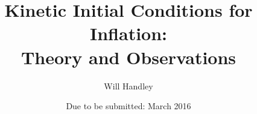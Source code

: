 \title{Kinetic Initial Conditions for Inflation:\\ Theory and Observations}

\author{Will Handley}
\date{Due to be submitted: March 2016}

\maketitle
